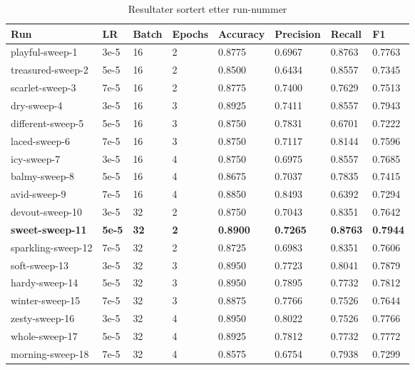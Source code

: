 \begin{table}
\caption{Resultater sortert etter run-nummer}
\label{tab:results}
\begin{tabular}{llllllll}
\toprule
Run & LR & Batch & Epochs & Accuracy & Precision & Recall & F1 \\
\midrule
playful-sweep-1 & 3e-5 & 16 & 2 & 0.8775 & 0.6967 & 0.8763 & 0.7763 \\
treasured-sweep-2 & 5e-5 & 16 & 2 & 0.8500 & 0.6434 & 0.8557 & 0.7345 \\
scarlet-sweep-3 & 7e-5 & 16 & 2 & 0.8775 & 0.7400 & 0.7629 & 0.7513 \\
dry-sweep-4 & 3e-5 & 16 & 3 & 0.8925 & 0.7411 & 0.8557 & 0.7943 \\
different-sweep-5 & 5e-5 & 16 & 3 & 0.8750 & 0.7831 & 0.6701 & 0.7222 \\
laced-sweep-6 & 7e-5 & 16 & 3 & 0.8750 & 0.7117 & 0.8144 & 0.7596 \\
icy-sweep-7 & 3e-5 & 16 & 4 & 0.8750 & 0.6975 & 0.8557 & 0.7685 \\
balmy-sweep-8 & 5e-5 & 16 & 4 & 0.8675 & 0.7037 & 0.7835 & 0.7415 \\
avid-sweep-9 & 7e-5 & 16 & 4 & 0.8850 & 0.8493 & 0.6392 & 0.7294 \\
devout-sweep-10 & 3e-5 & 32 & 2 & 0.8750 & 0.7043 & 0.8351 & 0.7642 \\
\textbf{sweet-sweep-11} & \textbf{5e-5} & \textbf{32} & \textbf{2} & \textbf{0.8900} & \textbf{0.7265} & \textbf{0.8763} & \textbf{0.7944} \\
sparkling-sweep-12 & 7e-5 & 32 & 2 & 0.8725 & 0.6983 & 0.8351 & 0.7606 \\
soft-sweep-13 & 3e-5 & 32 & 3 & 0.8950 & 0.7723 & 0.8041 & 0.7879 \\
hardy-sweep-14 & 5e-5 & 32 & 3 & 0.8950 & 0.7895 & 0.7732 & 0.7812 \\
winter-sweep-15 & 7e-5 & 32 & 3 & 0.8875 & 0.7766 & 0.7526 & 0.7644 \\
zesty-sweep-16 & 3e-5 & 32 & 4 & 0.8950 & 0.8022 & 0.7526 & 0.7766 \\
whole-sweep-17 & 5e-5 & 32 & 4 & 0.8925 & 0.7812 & 0.7732 & 0.7772 \\
morning-sweep-18 & 7e-5 & 32 & 4 & 0.8575 & 0.6754 & 0.7938 & 0.7299 \\
\bottomrule
\end{tabular}
\end{table}
